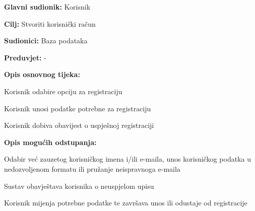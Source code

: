 				\noindent {}
				\begin{packed_item}
					
					\item \textbf{Glavni sudionik: } Korisnik
					\item  \textbf{Cilj:} Stvoriti korisnički račun
					\item  \textbf{Sudionici:} Baza podataka
					\item  \textbf{Preduvjet:} - 
					\item  \textbf{Opis osnovnog tijeka:}
					
					\item[] \begin{packed_enum}
						\item Korisnik odabire opciju za registraciju
						\item Korisnik unosi podatke potrebne za registraciju
						\item Korisnik dobiva obavijest o uspješnoj registraciji
					\end{packed_enum}
					\item  \textbf{Opis mogućih odstupanja:}
					\item[] \begin{packed_item}
						
						
						
						\item[2.a]      Odabir već zauzetog korisničkog imena i/ili e-maila, unos korisničkog podatka u nedozvoljenom formatu ili pružanje neispravnoga e-maila
						\item[] \begin{packed_enum}
							\item         Sustav obavještava korisnika o neuspjelom upisu
							\item         Korisnik mijenja potrebne podatke te završava unos ili odustaje od registracije
						\end{packed_enum}
					\end{packed_item}
				\end{packed_item}
				
